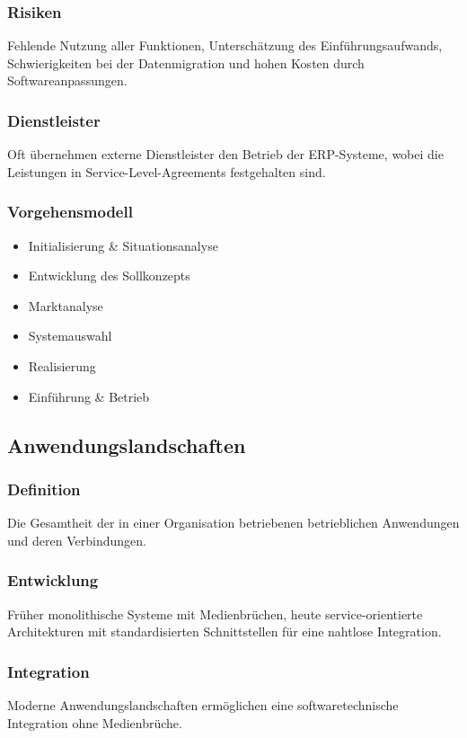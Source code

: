     \subsubsection*{Risiken}
        Fehlende Nutzung aller Funktionen, Unterschätzung des Einführungsaufwands, Schwierigkeiten bei der Datenmigration und hohen Kosten durch Softwareanpassungen.
    \subsubsection*{Dienstleister}
        Oft übernehmen externe Dienstleister den Betrieb der ERP-Systeme, wobei die Leistungen in Service-Level-Agreements festgehalten sind.
    \subsubsection*{Vorgehensmodell}
        \begin{itemize}
            \item Initialisierung \& Situationsanalyse
            \item Entwicklung des Sollkonzepts
            \item Marktanalyse
            \item Systemauswahl
            \item Realisierung
            \item Einführung \& Betrieb
        \end{itemize}

\subsection{Anwendungslandschaften}
    \subsubsection*{Definition}
        Die Gesamtheit der in einer Organisation betriebenen betrieblichen Anwendungen und deren Verbindungen.
    \subsubsection*{Entwicklung}
        Früher monolithische Systeme mit Medienbrüchen, heute service-orientierte Architekturen mit standardisierten Schnittstellen für eine nahtlose Integration.
    \subsubsection*{Integration}
        Moderne Anwendungslandschaften ermöglichen eine softwaretechnische Integration ohne Medienbrüche.